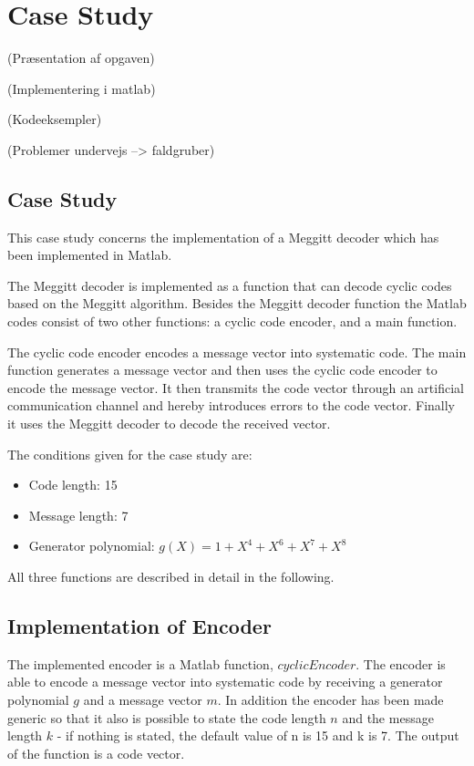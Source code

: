 \documentclass[Main]{subfiles}
\begin{document}
\section{Case Study}

(Præsentation af opgaven)

(Implementering i matlab)

(Kodeeksempler)

(Problemer undervejs --> faldgruber)

\subsection{Case Study}
This case study concerns the implementation of a Meggitt decoder which has been implemented in Matlab. 

\noindent The Meggitt decoder is implemented as a function that can decode cyclic codes based on the Meggitt algorithm. Besides the Meggitt decoder function the Matlab codes consist of two other functions: a cyclic code encoder, and a main function.

\noindent The cyclic code encoder encodes a message vector into systematic code. The main function generates a message vector and then uses the cyclic code encoder to encode the message vector. It then transmits the code vector through an artificial communication channel and hereby introduces errors to the code vector. Finally it uses the Meggitt decoder to decode the received vector. 

\noindent The conditions given for the case study are: 
\begin{itemize} \itemsep0pt \parskip0pt 
\item Code length: 15
\item Message length: 7
\item Generator polynomial: $g(X)=1+X^4+X^6+X^7+X^8$
\end{itemize} 

\noindent All three functions are described in detail in the following. 


\subsection{Implementation of Encoder}
The implemented encoder is a Matlab function, $cyclicEncoder$. The encoder is able to encode a message vector into systematic code by receiving a generator polynomial $g$ and a message vector $m$. In addition the encoder has been made generic so that it also is possible to state the code length $n$ and the message length $k$ - if nothing is stated, the default value of n is 15 and k is 7. The output of the function is a code vector. 
\end{document}
